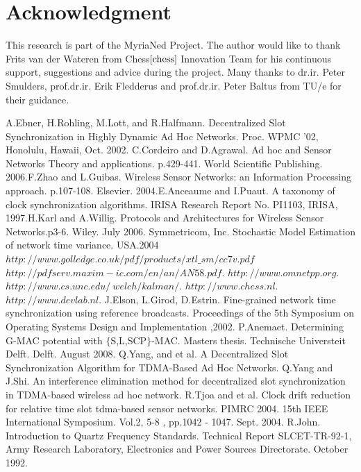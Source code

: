 \documentclass[journal]{IEEEtran}
\begin{document}
\section{\textbf{Acknowledgment}}This research is part of the MyriaNed Project. The author would like to thank Frits van der Wateren from Chess$\cite{chess}$ Innovation Team for his continuous support, suggestions and advice during the project. Many thanks to dr.ir. Peter Smulders, prof.dr.ir. Erik Fledderus and prof.dr.ir. Peter Baltus from TU/e for their guidance.
\begin{thebibliography}{\textbf{References}}
A.Ebner, H.Rohling, M.Lott, and R.Halfmann. Decentralized Slot Synchronization in Highly Dynamic Ad Hoc Networks. Proc. WPMC '02, Honolulu, Hawaii, Oct. 2002.
C.Cordeiro and D.Agrawal. Ad hoc and Sensor Networks Theory and applications. p.429-441. World Scientific Publishing. 2006.F.Zhao and  L.Guibas. Wireless Sensor Networks: an Information Processing approach. p.107-108. Elsevier. 2004.E.Anceaume and I.Puaut. A taxonomy of clock synchronization algorithms. IRISA Research Report No. PI1103, IRISA, 1997.H.Karl and A.Willig. Protocols and Architectures for Wireless Sensor Networks.p3-6. Wiley. July 2006.
Symmetricom, Inc. Stochastic Model Estimation of network time variance. USA.2004
 $http://www.golledge.co.uk/pdf/products/xtl\_sm/cc7v.pdf$
 $http://pdfserv.maxim-ic.com/en/an/AN58.pdf$.
$http://www.omnetpp.org$.
$http://www.cs.unc.edu/~welch/kalman/$.
$http://www.chess.nl$.
$http://www.devlab.nl$.
J.Elson, L.Girod, D.Estrin. Fine-grained network time synchronization using reference broadcasts. Proceedings of the 5th Symposium on Operating Systems Design and Implementation ,2002.
P.Anemaet. Determining G-MAC potential with $\{$S,L,SCP$\}$-MAC. Masters thesis. Technische Universteit Delft. Delft. August 2008.
Q.Yang, and et al. A Decentralized Slot Synchronization Algorithm for TDMA-Based Ad Hoc Networks.
Q.Yang and J.Shi. An interference elimination method for decentralized slot synchronization in TDMA-based wireless ad hoc network.
R.Tjoa and et al. Clock drift reduction for relative time slot tdma-based sensor networks. PIMRC 2004. 15th IEEE International Symposium. Vol.2, 5-8 , pp.1042 - 1047. Sept. 2004.
R.John. Introduction to Quartz Frequency Standards. Technical Report SLCET-TR-92-1, Army Research Laboratory, Electronics and Power Sources Directorate. October 1992.

\end{thebibliography}
\end{document}
